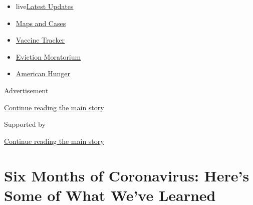 \begin{itemize}
\tightlist
\item
  live\href{https://www.nytimes3xbfgragh.onion/2020/09/05/world/coronavirus-covid.html?name=styln-coronavirus-national\&region=TOP_BANNER\&block=storyline_menu_recirc\&action=click\&pgtype=Article\&impression_id=5a85dfe0-efba-11ea-a4c9-41c298b92ba2\&variant=undefined}{Latest
  Updates}
\item
  \href{https://www.nytimes3xbfgragh.onion/interactive/2020/us/coronavirus-us-cases.html?name=styln-coronavirus-national\&region=TOP_BANNER\&block=storyline_menu_recirc\&action=click\&pgtype=Article\&impression_id=5a85dfe1-efba-11ea-a4c9-41c298b92ba2\&variant=undefined}{Maps
  and Cases}
\item
  \href{https://www.nytimes3xbfgragh.onion/interactive/2020/science/coronavirus-vaccine-tracker.html?name=styln-coronavirus-national\&region=TOP_BANNER\&block=storyline_menu_recirc\&action=click\&pgtype=Article\&impression_id=5a85dfe2-efba-11ea-a4c9-41c298b92ba2\&variant=undefined}{Vaccine
  Tracker}
\item
  \href{https://www.nytimes3xbfgragh.onion/2020/09/02/your-money/eviction-moratorium-covid.html?name=styln-coronavirus-national\&region=TOP_BANNER\&block=storyline_menu_recirc\&action=click\&pgtype=Article\&impression_id=5a85dfe3-efba-11ea-a4c9-41c298b92ba2\&variant=undefined}{Eviction
  Moratorium}
\item
  \href{https://www.nytimes3xbfgragh.onion/interactive/2020/09/02/magazine/food-insecurity-hunger-us.html?name=styln-coronavirus-national\&region=TOP_BANNER\&block=storyline_menu_recirc\&action=click\&pgtype=Article\&impression_id=5a85dfe4-efba-11ea-a4c9-41c298b92ba2\&variant=undefined}{American
  Hunger}
\end{itemize}

Advertisement

\protect\hyperlink{after-top}{Continue reading the main story}

Supported by

\protect\hyperlink{after-sponsor}{Continue reading the main story}

\hypertarget{six-months-of-coronavirus-heres-some-of-what-weve-learned}{%
\section{Six Months of Coronavirus: Here's Some of What We've
Learned}\label{six-months-of-coronavirus-heres-some-of-what-weve-learned}}


